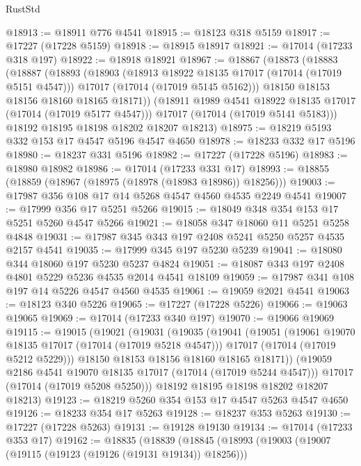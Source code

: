 \begin{lexlean}{RustStd}
\begin{coremodule}
@18913 := @18911 @776 @4541
@18915 := @18123 @318 @5159
@18917 := @17227 (@17228 @5159)
@18918 := @18915 @18917
@18921 := @17014 (@17233 @318 @197)
@18922 := @18918 @18921
@18967 := @18867
    (@18873
      (@18883
        (@18887
          (@18893
            (@18903
              (@18913 @18922 @18135 @17017 (@17014 (@17019 @5151 @4547)))
              @17017
              (@17014 (@17019 @5145 @5162)))
            @18150
            @18153
            @18156
            @18160
            @18165
            @18171))
        (@18911 @1989 @4541 @18922 @18135 @17017 (@17014 (@17019 @5177 @4547)))
        @17017
        (@17014 (@17019 @5141 @5183)))
      @18192
      @18195
      @18198
      @18202
      @18207
      @18213)
@18975 := @18219 @5193 @332 @153 @17 @4547 @5196 @4547 @4650
@18978 := @18233 @332 @17 @5196
@18980 := @18237 @331 @5196
@18982 := @17227 (@17228 @5196)
@18983 := @18980 @18982
@18986 := @17014 (@17233 @331 @17)
@18993 := @18855 (@18859 (@18967 (@18975 (@18978 (@18983 @18986)) @18256)))
@19003 := @17987 @356 @108 @17 @14 @5268 @4547 @4560 @4535 @2249 @4541
@19007 := @17999 @356 @17 @5251 @5266
@19015 := @18049 @348 @354 @153 @17 @5251 @5260 @4547 @5266
@19021 := @18058 @347 @18060 @11 @5251 @5258 @4848
@19031 := @17987 @345 @343 @197 @2408 @5241 @5250 @5257 @4535 @2157 @4541
@19035 := @17999 @345 @197 @5230 @5239
@19041 := @18080 @344 @18060 @197 @5230 @5237 @4824
@19051 := @18087 @343 @197 @2408 @4801 @5229 @5236 @4535 @2014 @4541 @18109
@19059 := @17987 @341 @108 @197 @14 @5226 @4547 @4560 @4535
@19061 := @19059 @2021 @4541
@19063 := @18123 @340 @5226
@19065 := @17227 (@17228 @5226)
@19066 := @19063 @19065
@19069 := @17014 (@17233 @340 @197)
@19070 := @19066 @19069
@19115 := @19015
    (@19021
      (@19031
        (@19035
          (@19041
            (@19051
              (@19061 @19070 @18135 @17017 (@17014 (@17019 @5218 @4547)))
              @17017
              (@17014 (@17019 @5212 @5229)))
            @18150
            @18153
            @18156
            @18160
            @18165
            @18171))
        (@19059 @2186 @4541 @19070 @18135 @17017 (@17014 (@17019 @5244 @4547)))
        @17017
        (@17014 (@17019 @5208 @5250)))
      @18192
      @18195
      @18198
      @18202
      @18207
      @18213)
@19123 := @18219 @5260 @354 @153 @17 @4547 @5263 @4547 @4650
@19126 := @18233 @354 @17 @5263
@19128 := @18237 @353 @5263
@19130 := @17227 (@17228 @5263)
@19131 := @19128 @19130
@19134 := @17014 (@17233 @353 @17)
@19162 := @18835
    (@18839
      (@18845
        (@18993
          (@19003
            (@19007 (@19115 (@19123 (@19126 (@19131 @19134)) @18256)))

\end{coremodule}
\end{lexlean}
